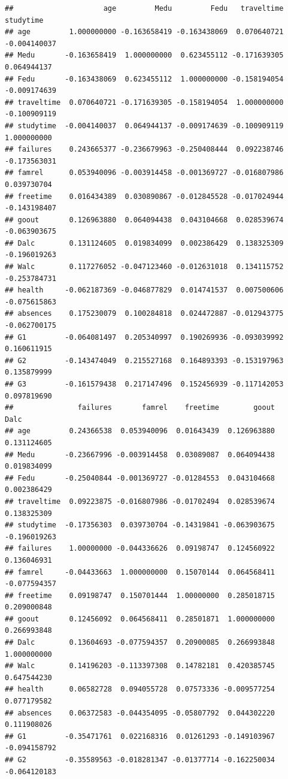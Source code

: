 \documentclass[
]{article}
\begin{document}
\begin{verbatim}
##                     age         Medu         Fedu   traveltime    studytime
## age         1.000000000 -0.163658419 -0.163438069  0.070640721 -0.004140037
## Medu       -0.163658419  1.000000000  0.623455112 -0.171639305  0.064944137
## Fedu       -0.163438069  0.623455112  1.000000000 -0.158194054 -0.009174639
## traveltime  0.070640721 -0.171639305 -0.158194054  1.000000000 -0.100909119
## studytime  -0.004140037  0.064944137 -0.009174639 -0.100909119  1.000000000
## failures    0.243665377 -0.236679963 -0.250408444  0.092238746 -0.173563031
## famrel      0.053940096 -0.003914458 -0.001369727 -0.016807986  0.039730704
## freetime    0.016434389  0.030890867 -0.012845528 -0.017024944 -0.143198407
## goout       0.126963880  0.064094438  0.043104668  0.028539674 -0.063903675
## Dalc        0.131124605  0.019834099  0.002386429  0.138325309 -0.196019263
## Walc        0.117276052 -0.047123460 -0.012631018  0.134115752 -0.253784731
## health     -0.062187369 -0.046877829  0.014741537  0.007500606 -0.075615863
## absences    0.175230079  0.100284818  0.024472887 -0.012943775 -0.062700175
## G1         -0.064081497  0.205340997  0.190269936 -0.093039992  0.160611915
## G2         -0.143474049  0.215527168  0.164893393 -0.153197963  0.135879999
## G3         -0.161579438  0.217147496  0.152456939 -0.117142053  0.097819690
##               failures       famrel    freetime        goout         Dalc
## age         0.24366538  0.053940096  0.01643439  0.126963880  0.131124605
## Medu       -0.23667996 -0.003914458  0.03089087  0.064094438  0.019834099
## Fedu       -0.25040844 -0.001369727 -0.01284553  0.043104668  0.002386429
## traveltime  0.09223875 -0.016807986 -0.01702494  0.028539674  0.138325309
## studytime  -0.17356303  0.039730704 -0.14319841 -0.063903675 -0.196019263
## failures    1.00000000 -0.044336626  0.09198747  0.124560922  0.136046931
## famrel     -0.04433663  1.000000000  0.15070144  0.064568411 -0.077594357
## freetime    0.09198747  0.150701444  1.00000000  0.285018715  0.209000848
## goout       0.12456092  0.064568411  0.28501871  1.000000000  0.266993848
## Dalc        0.13604693 -0.077594357  0.20900085  0.266993848  1.000000000
## Walc        0.14196203 -0.113397308  0.14782181  0.420385745  0.647544230
## health      0.06582728  0.094055728  0.07573336 -0.009577254  0.077179582
## absences    0.06372583 -0.044354095 -0.05807792  0.044302220  0.111908026
## G1         -0.35471761  0.022168316  0.01261293 -0.149103967 -0.094158792
## G2         -0.35589563 -0.018281347 -0.01377714 -0.162250034 -0.064120183

\end{verbatim}
\end{document}
